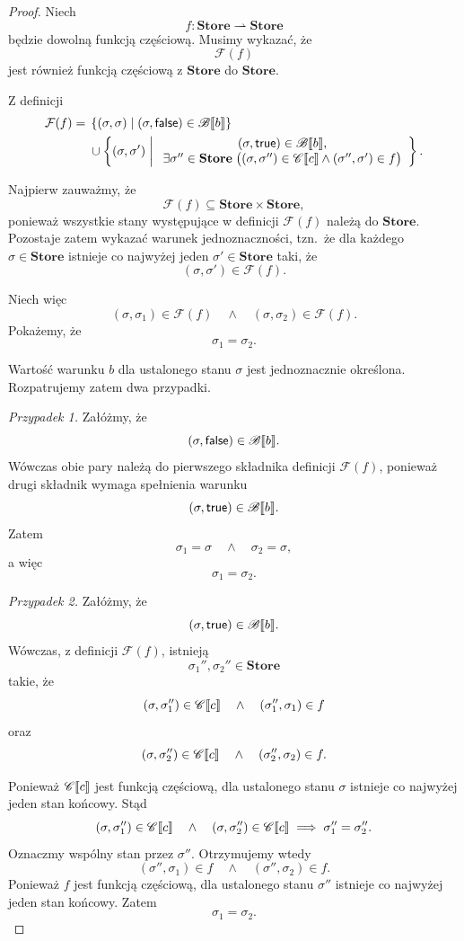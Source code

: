 \documentclass[11pt,a4paper]{article}
\theoremstyle{definition}
\theoremstyle{plain}
\DeclarePairedDelimiter{\semdelim}{\llbracket}{\rrbracket}
\newcommand{\sem}[1]{\semdelim{#1}}
\newcommand{\Cc}{\mathscr{C}}   %
\newcommand{\Bb}{\mathscr{B}}   %
\newcommand{\Store}{\textbf{Store}}
\newcommand{\kw}[1]{\ensuremath{\mathsf{#1}}} %
\begin{document}
\begin{proof}
	Niech
	\[
	f:\Store\rightharpoonup\Store
	\]
	będzie dowolną funkcją częściową. Musimy wykazać, że
	\[
	\mathcal{F}(f)
	\]
	jest również funkcją częściową z $\Store$ do $\Store$.
	
	Z definicji
	\[
	\begin{aligned}
		\mathcal{F}(f)
		={}&
		\left\{
		(\sigma,\sigma)
		\;\middle|\;
		(\sigma,\kw{false})\in\Bb\sem{b}
		\right\}\\
		&{}\cup
		\left\{
		(\sigma,\sigma')
		\;\middle|\;
		\begin{array}{c}
			(\sigma,\kw{true})\in\Bb\sem{b},\\
			\exists\sigma''\in\Store\;
			\big(
			(\sigma,\sigma'')\in\Cc\sem{c}
			\land
			(\sigma'',\sigma')\in f
			\big)
		\end{array}
		\right\}.
	\end{aligned}
	\]
	
	Najpierw zauważmy, że
	\[
	\mathcal{F}(f)\subseteq\Store\times\Store,
	\]
	ponieważ wszystkie stany występujące w definicji $\mathcal{F}(f)$
	należą do $\Store$. Pozostaje zatem wykazać warunek jednoznaczności,
	tzn.\ że dla każdego $\sigma\in\Store$ istnieje co najwyżej jeden
	$\sigma'\in\Store$ taki, że
	\[
	(\sigma,\sigma')\in\mathcal{F}(f).
	\]
	
	Niech więc
	\[
	(\sigma,\sigma_1)\in\mathcal{F}(f)
	\quad\land\quad
	(\sigma,\sigma_2)\in\mathcal{F}(f).
	\]
	Pokażemy, że
	\[
	\sigma_1=\sigma_2.
	\]
	
	Wartość warunku $b$ dla ustalonego stanu $\sigma$ jest jednoznacznie
	określona. Rozpatrujemy zatem dwa przypadki.
	
	\emph{Przypadek 1.}
	Załóżmy, że
	\[
	(\sigma,\kw{false})\in\Bb\sem{b}.
	\]
	Wówczas obie pary należą do pierwszego składnika definicji
	$\mathcal{F}(f)$, ponieważ drugi składnik wymaga spełnienia warunku
	\[
	(\sigma,\kw{true})\in\Bb\sem{b}.
	\]
	Zatem
	\[
	\sigma_1=\sigma
	\quad\land\quad
	\sigma_2=\sigma,
	\]
	a więc
	\[
	\sigma_1=\sigma_2.
	\]
	
	\emph{Przypadek 2.}
	Załóżmy, że
	\[
	(\sigma,\kw{true})\in\Bb\sem{b}.
	\]
	Wówczas, z definicji $\mathcal{F}(f)$, istnieją
	\[
	\sigma_1'',\sigma_2''\in\Store
	\]
	takie, że
	\[
	(\sigma,\sigma_1'')\in\Cc\sem{c}
	\quad\land\quad
	(\sigma_1'',\sigma_1)\in f
	\]
	oraz
	\[
	(\sigma,\sigma_2'')\in\Cc\sem{c}
	\quad\land\quad
	(\sigma_2'',\sigma_2)\in f.
	\]
	
	Ponieważ $\Cc\sem{c}$ jest funkcją częściową, dla ustalonego stanu
	$\sigma$ istnieje co najwyżej jeden stan końcowy. Stąd
	\[
	(\sigma,\sigma_1'')\in\Cc\sem{c}
	\quad\land\quad
	(\sigma,\sigma_2'')\in\Cc\sem{c}
	\implies
	\sigma_1''=\sigma_2''.
	\]
	Oznaczmy wspólny stan przez $\sigma''$. Otrzymujemy wtedy
	\[
	(\sigma'',\sigma_1)\in f
	\quad\land\quad
	(\sigma'',\sigma_2)\in f.
	\]
	Ponieważ $f$ jest funkcją częściową, dla ustalonego stanu $\sigma''$
	istnieje co najwyżej jeden stan końcowy. Zatem
	\[
	\sigma_1=\sigma_2.
	\]
	

\end{proof}
\end{document}
